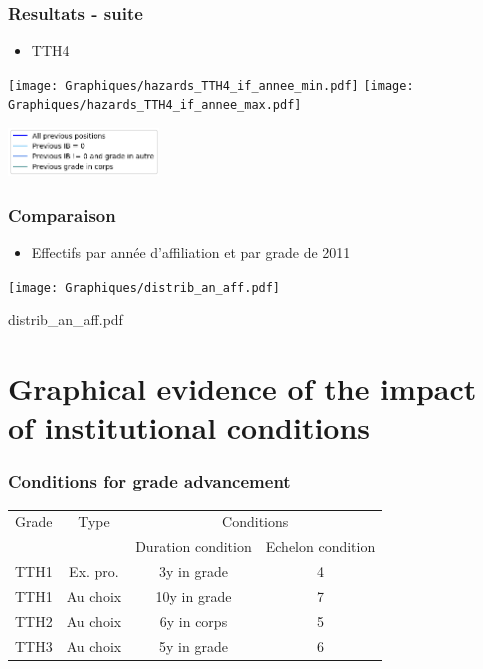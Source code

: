 \documentclass[xcolor=table,ignorenonframetext,12pt]{beamer}
\newenvironment{choixmarges}[2]{\begin{list}{}{%
\setlength{\topsep}{0pt}%
\setlength{\leftmargin}{0pt}%
\setlength{\rightmargin}{0pt}%
\setlength{\listparindent}{\parindent}%
\setlength{\itemindent}{\parindent}%
\setlength{\parsep}{0pt plus 1pt}%
\addtolength{\leftmargin}{#1}%
\addtolength{\rightmargin}{#2}%
}\item }{\end{list}}
\begin{document}
\begin{frame}
\frametitle{Resultats - suite}
\begin{itemize}
	\item TTH4
\end{itemize}
\begin{center}
	\texttt{[image: Graphiques/hazards\_TTH4\_if\_annee\_min.pdf]}
	\texttt{[image: Graphiques/hazards\_TTH4\_if\_annee\_max.pdf]}
\end{center}
\begin{center}
	\includegraphics[width=0.3\textwidth]{Graphiques/legend.png}
\end{center}

\end{frame}


\begin{frame}
\frametitle{Comparaison}
\begin{itemize}
	\item Effectifs par année d'affiliation et par grade de 2011
\end{itemize}
\begin{center}
	\texttt{[image: Graphiques/distrib\_an\_aff.pdf]}
\end{center}


\end{frame}

distrib_an_aff.pdf



\section{Graphical evidence of the impact of institutional conditions}


\begin{frame}

\begin{choixmarges}{-1cm}{-1cm}


\frametitle{Conditions for grade advancement}
\begin{table}
\small
\begin{tabular}{l|c|cc}

\toprule
 Grade  & Type &  \multicolumn{2}{c}{Conditions}  \\
		&  			&  Duration condition	&  Echelon condition \\
\midrule
TTH1  &	Ex. pro. 	&   3y in grade  & 	4  \\
TTH1  &	Au choix 	& 	10y in grade &	7   \\ \midrule
TTH2  & Au choix		& 	6y in corps  &	5   \\ \midrule
TTH3  & Au choix		& 	5y in grade  &	6   \\	
%	
\bottomrule
\end{tabular}
\end{table}
\end{choixmarges}
\end{frame}
\end{document}
